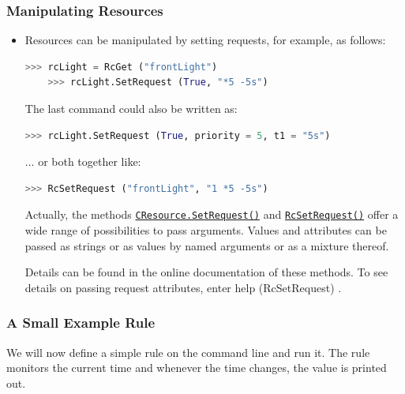 \documentclass[12pt,english,parskip=half,headheight=19pt]{scrreprt}
\newcommand{\lstf}[1]{\colorbox{lstbackground}{\ttfamily\footnotesize#1}}
\newcommand{\refapipython}[1]{\href{home2l-api_python/index.html}{\mbox{\texttt{#1}}}}  %
\begin{document}
\subsubsection*{Manipulating Resources}

\begin{itemize}[$\blacktriangleright$]

\item
  Resources can be manipulated by setting requests, for example, as follows:
  \begin{lstlisting}[language=python]
    >>> rcLight = RcGet ("frontLight")
    >>> rcLight.SetRequest (True, "*5 -5s")
  \end{lstlisting}
  The last command could also be written as:
  \begin{lstlisting}[language=python]
    >>> rcLight.SetRequest (True, priority = 5, t1 = "5s")
  \end{lstlisting}
  ... or both together like:
  \begin{lstlisting}[language=python]
  >>> RcSetRequest ("frontLight", "1 *5 -5s")
  \end{lstlisting}
  Actually, the methods \refapipython{CResource.SetRequest()} and \refapipython{RcSetRequest()}
  offer a wide range of possibilities to pass arguments. Values and attributes can be passed as strings
  or as values by named arguments or as a mixture thereof.

  Details can be found in the online documentation of these methods. To see details on passing
  request attributes, enter \lstf{help (RcSetRequest)} .

\end{itemize}



\subsubsection*{A Small Example Rule}

We will now define a simple rule on the command line and run it.
The rule monitors the current time and whenever the time changes, the value is printed out.
\end{document}
